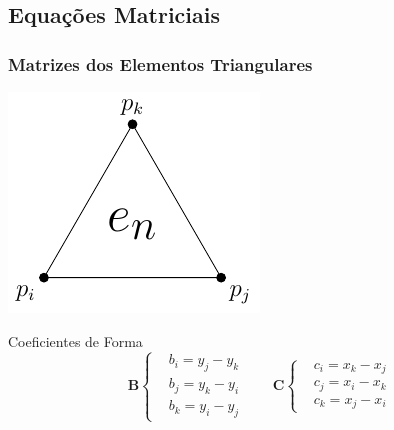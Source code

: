 \documentclass{beamer}
\begin{document}
\subsection{Equações Matriciais}
\begin{frame}
  \frametitle{Matrizes dos Elementos Triangulares}
  \begin{minipage}{.25\textwidth}
    \centering
    \includegraphics[width=0.95\linewidth]{figure/element.pdf}
  \end{minipage}
  \hfill
  \begin{minipage}{.7\textwidth}
    \begin{block}{Coeficientes de Forma}
      \vspace*{-\baselineskip}\setlength\belowdisplayshortskip{0pt} %
      \centering
      \begin{equation*}
      \mathbf{B} \left\{
	\begin{align*}
	  &b_i = y_j - y_k \\
	  &b_j = y_k - y_i \\
	  &b_k = y_i - y_j
	\end{align*} \right.\qquad
      \mathbf{C} \left\{
	\begin{align*}
	  &c_i = x_k - x_j \\
	  &c_j = x_i - x_k \\
	  &c_k = x_j - x_i
	\end{align*} \right.
      \end{equation*}
    \end{block}
  \end{minipage}
  

\end{frame}
\end{document}
